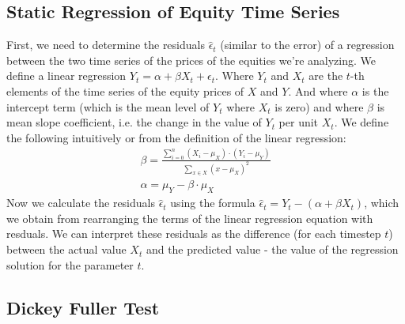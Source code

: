 \documentclass{article}
\begin{document}
\begin{spacing}{2.0}
\subsection{Static Regression of Equity Time Series}

First, we need to determine the residuals $\hat \epsilon_{t}$ (similar to the error) of a regression between
the two time series of the prices of the equities we're analyzing. We define a linear regression $Y_{t} = \alpha + \beta X_{t} + \epsilon_{t}$.
Where $Y_{t}$ and $X_{t}$ are the $t$-th elements of the time series of the equity prices of $X$ and $Y$. And where $\alpha$ is the
intercept term (which is the mean level of $Y_{t}$ where $X_{t}$ is zero) and where $\beta$ is mean slope coefficient, i.e. the change in
the value of $Y_{t}$ per unit $X_{t}$.
We define the following intuitively or from the definition of the linear regression:
\begin{gather*}
    \beta = \frac{
        \sum_{i = 0}^{n}{(X_{i} - \mu_{X}) \cdot (Y_{i} - \mu_{Y})}
    }{
        \sum_{x \in X} (x - \mu_{X})^2
    }
    \\
    \alpha = \mu_{Y} - \beta \cdot \mu_{X}
\end{gather*}
Now we calculate the residuals $\hat \epsilon_{t}$ using the formula $\hat \epsilon_{t} = Y_{t} - (\alpha + \beta X_{t})$, which we obtain from rearranging the
terms of the linear regression equation with resduals. We can interpret these residuals as the difference (for each timestep $t$) between the actual value $X_{t}$
and the predicted value - the value of the regression solution for the parameter $t$.



\subsection{Dickey Fuller Test}


\end{spacing}
\end{document}
